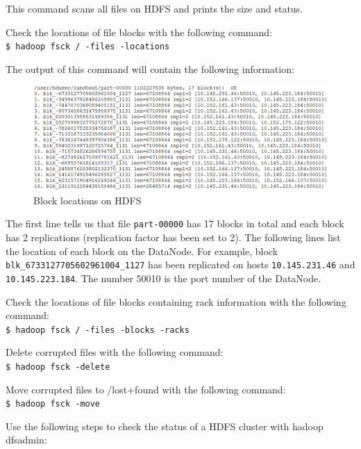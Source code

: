 This command scans all files on HDFS and prints the size and status.

Check the locations of file blocks with the following command: \\
\verb|$ hadoop fsck / -files -locations|

The output of this command will contain the following information:
\begin{figure}[h]
  \centering
  \includegraphics[width=\textwidth]{figs/5163os_04_07.png}
  \caption{Block locations on HDFS}\label{fig:hdfs.block.locations}
\end{figure} 

The first line tells us that file \verb|part-00000| has 17 blocks in total and each block has 2 replications (replication factor has been set to 2). The following lines list the location of each block on the DataNode. For example, block \verb|blk_6733127705602961004_1127| has been replicated on hosts \verb|10.145.231.46| and \verb|10.145.223.184|. The number 50010 is the port number of the DataNode.

Check the locations of file blocks containing rack information with the following command: \\
\verb|$ hadoop fsck / -files -blocks -racks|

Delete corrupted files with the following command:\\
\verb|$ hadoop fsck -delete|

Move corrupted files to /lost+found with the following command: \\
\verb|$ hadoop fsck -move|

Use the following steps to check the status of a HDFS cluster with hadoop dfsadmin:

